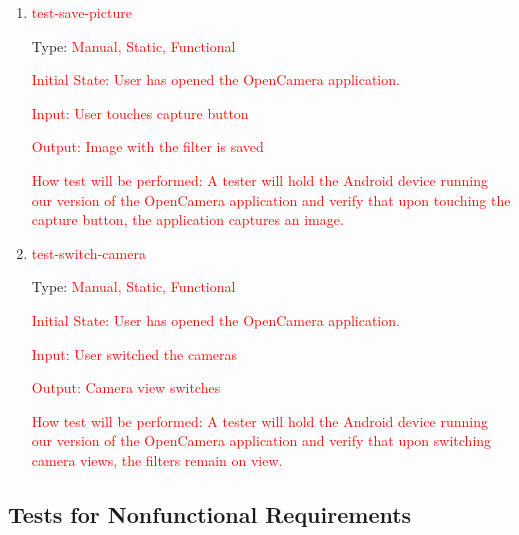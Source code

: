 \documentclass[12pt, titlepage]{article}
\begin{document}
\begin{enumerate}

\item{\textcolor{red}{ test-save-picture}\\}

Type: \textcolor{red}{Manual, Static, Functional}
					
\textcolor{red}{Initial State: 
    User has opened the OpenCamera application.}
					
\textcolor{red}{Input: User touches capture button}
					
\textcolor{red}{Output: Image with the filter is saved}
					
\textcolor{red}{How test will be performed: A tester will hold the Android device running our version of the OpenCamera application and verify that upon touching the capture button, the application captures an image.}

\item{\textcolor{red}{ test-switch-camera}\\}

Type: \textcolor{red}{Manual, Static, Functional}
					
\textcolor{red}{Initial State: 
    User has opened the OpenCamera application.}
					
\textcolor{red}{Input: User switched the cameras}
					
\textcolor{red}{Output: Camera view switches}
					
\textcolor{red}{How test will be performed: A tester will hold the Android device running our version of the OpenCamera application and verify that upon switching camera views, the filters remain on view.}

\end{enumerate}

\subsection{Tests for Nonfunctional Requirements}
\end{document}

